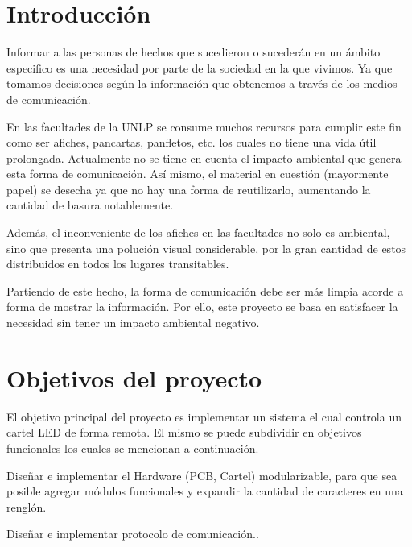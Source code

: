 \section{Introducción}
Informar a las personas de hechos que sucedieron o sucederán en un ámbito especifico es una necesidad por parte de la sociedad en la que vivimos. Ya que tomamos decisiones según la información que obtenemos a través de los medios de comunicación.

En las facultades de la UNLP se consume muchos recursos para cumplir este fin como ser afiches, pancartas, panfletos, etc. los cuales no tiene una vida útil prolongada. Actualmente no se tiene en cuenta el impacto ambiental que genera esta forma de comunicación.
Así mismo, el material en cuestión (mayormente papel) se desecha ya que no hay una forma de reutilizarlo, aumentando la cantidad de basura notablemente.

Además, el inconveniente de los afiches en las facultades no solo es ambiental, sino que presenta una polución visual considerable, por la gran cantidad de estos distribuidos en todos los lugares transitables.

Partiendo de este hecho, la forma de comunicación debe ser más limpia acorde a forma de mostrar la información.
Por ello, este proyecto se basa en satisfacer la necesidad sin tener un impacto ambiental negativo.

\section{Objetivos del proyecto}
El objetivo principal del proyecto es implementar un sistema el cual controla un cartel LED de forma remota.
El mismo se puede subdividir en objetivos funcionales los cuales se mencionan a continuación.

Diseñar e implementar el Hardware (PCB, Cartel) modularizable, para que sea posible agregar módulos funcionales y expandir la cantidad de caracteres en una renglón.

Diseñar e implementar protocolo de comunicación..


